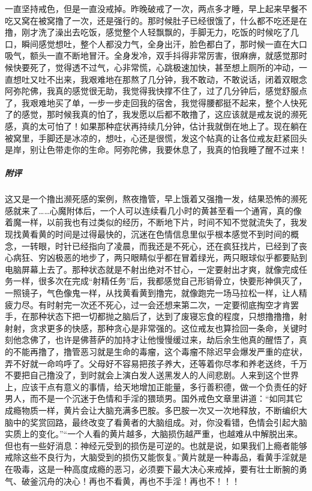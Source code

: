\begin{case}
    一直坚持戒色，但是一直没戒掉。昨晚破戒了一次，两点多才睡，早上起来早餐不吃又窝在被窝撸了一次，还是强行的。那时候肚子已经很饿了，什么都不吃还是在撸，刚才洗了澡出去吃饭，感觉整个人轻飘飘的，手脚无力，吃饭的时候吃了几口，瞬间感觉想吐，整个人都没力气，全身出汗，脸色都白了，那时候一直在大口吸气，额头一直不断地冒汗。全身发冷，双手抖得非常厉害，很麻痹，就感觉那时候快要死了，觉得透不过气，心非常慌，心跳极速加快，甚至想上厕所的冲动，一直想吐又吐不出来，我艰难地在那熬了几分钟，我不敢动，不敢说话，闭着双眼念阿弥陀佛，我真的感觉很无助，我觉得我快撑不住了，过了几分钟后，感觉舒服点了，我艰难地买了单，一步一步走回我的宿舍，我觉得腰都挺不起来，整个人快死了的感觉，那时候我真的怕了，我发愿以后都不敢撸了，这应该就是戒友说的濒死感，真的太可怕了！如果那种症状再持续几分钟，估计我就倒在地上了。现在躺在被窝里，手脚还是冰凉的，想吐，心还是很慌，发这个帖真的让各位戒友赶紧回头是岸，别让色带走你的生命。阿弥陀佛，我要休息了，我真的怕我睡了醒不过来！
    \subparagraph{附评} 这又是一个撸出濒死感的案例，熬夜撸管，早上饿着又强撸一发，结果恐怖的濒死感就来了……心魔附体后，一个人可以连续看几小时的黄甚至看一个通宵，真的像着魔一样，以前我也有过类似的经历，不断地下片，时间不知不觉就流失了，我发现找黄看黄的时间是过得最快的，沉迷在色情信息里似乎根本感觉不到时间的概念，一转眼，时针已经指向了凌晨，而我还是不死心，还在疯狂找片，已经到了丧心病狂、穷凶极恶的地步了，两只眼睛似乎都在冒着绿光，两只眼球似乎都要贴到电脑屏幕上去了。那种状态就是不射出绝对不甘心，一定要射出才爽，就像完成任务一样，很多次在完成“射精任务”后，我都感觉自己形销骨立，快要形神俱灭了，一照镜子，气色像鬼一样，从找黄看黄到撸完，就像跑完一场马拉松一样，让人精疲力尽。有时射完一次还不死心，过一会还想来第二次，一定要彻底掏空才肯罢手，在那种状态下把一切都抛之脑后了，达到了废寝忘食的程度，只想撸撸撸，射射射，贪求更多的快感，那种贪心是非常强的。这位戒友也算捡回一条命，关键时刻他念佛了，也许是佛菩萨的加持才让他慢慢缓过来，劫后余生他真的醒悟了，真的不能再撸了，撸管恶习就是生命的毒瘤，这个毒瘤不除迟早会爆发严重的症状，弄不好就一命呜呼了。父母好不容易把孩子养大，还等着你尽孝和养老送终，千万不要把自己撸没了，到时就会上演白发人送黑发人的人间悲剧。人来到这个世界上，应该干点有意义的事情，给天地增加正能量，多行善积德，做一个负责任的好男人，而不是一个沉迷于色情和手淫的猥琐男。国外戒色文章里讲道：“如同其它成瘾物质一样，黄片会让大脑充满多巴胺。多巴胺一次又一次地释放，不断编织大脑中的奖赏回路，最终改变了看黄者的大脑组成。对，你没看错，色情会引起大脑实质上的变化。”“一个人看的黄片越多，大脑损伤越严重，也越难从中解脱出来。但也有一些好消息：神经元受到的损伤是可逆的。也就是说，如果我们上瘾者能够戒除这些不良行为，大脑受到的损伤又能恢复。”黄片就是一种毒品，看黄手淫就是在吸毒，这是一种高度成瘾的恶习，必须要下最大决心来戒掉，要有壮士断腕的勇气、破釜沉舟的决心！再也不看黄，再也不手淫！再也不！！！
\end{case}

